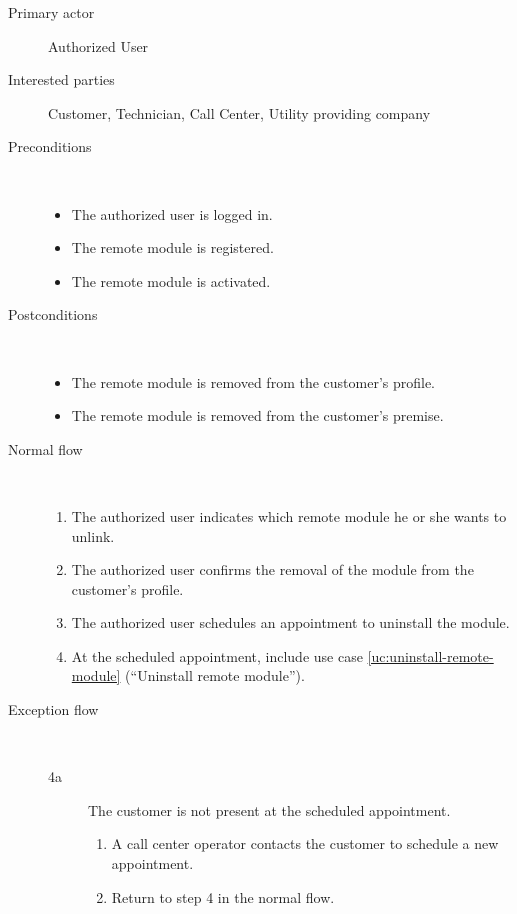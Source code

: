 \begin{description}
	\item[Primary actor] Authorized User
	\item[Interested parties] Customer, Technician, Call Center, Utility providing
	company
	\item[Preconditions] \ 
	\begin{itemize}
		\item The authorized user is logged in. 
		\item The remote module is registered.
		\item The remote module is activated.
	\end{itemize}
	\item[Postconditions] \ 
	\begin{itemize}
		\item The remote module is removed from the customer's profile.
		\item The remote module is removed from the customer's premise.
	\end{itemize}
	\item[Normal flow] \ 
	\begin{enumerate}
	  	\item The authorized user indicates which remote module he or she
	  	wants to unlink.
	  	\item The authorized user confirms the removal of the module from
	  	the customer's profile.
	  	\item The authorized user schedules an appointment to uninstall the
	  	module.
	  	\item At the scheduled appointment, include use case
	  	\ref{uc:uninstall-remote-module} (``Uninstall remote module'').
	\end{enumerate}
	\item[Exception flow] \
	\begin{description}
		\item[4a] The customer is not present at the scheduled appointment.
		\begin{enumerate}
			\item A call center operator contacts the customer to schedule a new
			appointment.
			\item Return to step 4 in the normal flow.
		\end{enumerate}
	\end{description}
\end{description}
